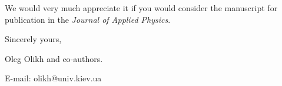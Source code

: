 \documentclass[preprint]{elsarticle}
\begin{document}

We would  very much appreciate it if you would consider the manuscript for publication in the \emph{Journal of Applied Physics}.

\vspace{3mm}

Sincerely yours,

Oleg Olikh and co-authors.

E-mail: olikh@univ.kiev.ua


\end{document}
